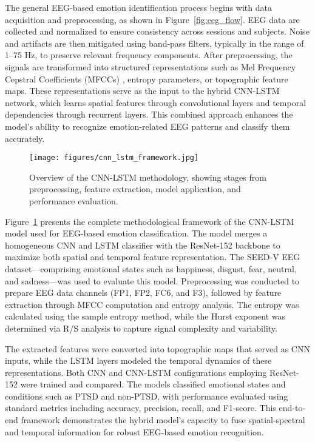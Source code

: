 \documentclass[conference]{IEEEtran}
\begin{document}
The general EEG-based emotion identification process begins with data acquisition and preprocessing, as shown in Figure~\ref{fig:eeg_flow}. EEG data are collected and normalized to ensure consistency across sessions and subjects. Noise and artifacts are then mitigated using band-pass filters, typically in the range of 1–75 Hz, to preserve relevant frequency components. After preprocessing, the signals are transformed into structured representations such as Mel Frequency Cepstral Coefficients (MFCCs) \cite{Chakravarthi2022EEGHybridCNNLSTM}, entropy parameters, or topographic feature maps. These representations serve as the input to the hybrid CNN-LSTM network, which learns spatial features through convolutional layers and temporal dependencies through recurrent layers. This combined approach enhances the model’s ability to recognize emotion-related EEG patterns and classify them accurately.

\begin{figure}[H]
    \centering
    \texttt{[image: figures/cnn\_lstm\_framework.jpg]}
    \caption{Overview of the CNN-LSTM methodology, showing stages from preprocessing, feature extraction, model application, and performance evaluation.}
    \label{fig:cnn_lstm_framework}
\end{figure}

Figure~\ref{fig:cnn_lstm_framework} presents the complete methodological framework of the CNN-LSTM model used for EEG-based emotion classification. The model merges a homogeneous CNN and LSTM classifier with the ResNet-152 backbone to maximize both spatial and temporal feature representation. The SEED-V EEG dataset—comprising emotional states such as happiness, disgust, fear, neutral, and sadness—was used to evaluate this model. Preprocessing was conducted to prepare EEG data channels (FP1, FP2, FC6, and F3), followed by feature extraction through MFCC \cite{Chakravarthi2022EEGHybridCNNLSTM} computation and entropy analysis. The entropy was calculated using the sample entropy method, while the Hurst exponent was determined via R/S analysis to capture signal complexity and variability.

The extracted features were converted into topographic maps that served as CNN inputs, while the LSTM layers modeled the temporal dynamics of these representations. Both CNN and CNN-LSTM configurations employing ResNet-152 were trained and compared. The models classified emotional states and conditions such as PTSD and non-PTSD, with performance evaluated using standard metrics including accuracy, precision, recall, and F1-score. This end-to-end framework demonstrates the hybrid model’s capacity to fuse spatial-spectral and temporal information for robust EEG-based emotion recognition.
\end{document}
